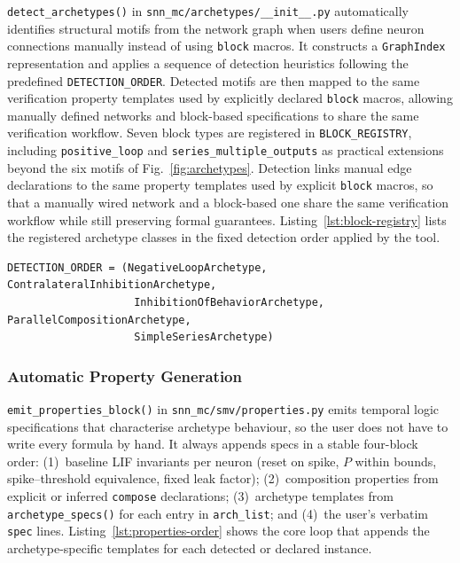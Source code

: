 \documentclass[
]{ceurart}
\begin{document}
\texttt{detect\_archetypes()} in \texttt{snn\_mc/archetypes/\_\_init\_\_.py}
automatically identifies structural motifs from the network graph when users
define neuron connections manually instead of using \texttt{block} macros. It
constructs a \texttt{GraphIndex} representation and applies a sequence of
detection heuristics following the predefined
\texttt{DETECTION\_ORDER}. Detected motifs are then mapped to the same
verification property templates used by explicitly declared
\texttt{block} macros, allowing manually defined networks and block-based
specifications to share the same verification workflow.
Seven block types are registered in \texttt{BLOCK\_REGISTRY}, including
\texttt{positive\_loop} and \texttt{series\_multiple\_outputs} as
practical extensions beyond the six motifs of Fig.~\ref{fig:archetypes}.
Detection links manual edge declarations to the same property templates
used by explicit \texttt{block} macros, so that a manually wired network
and a block-based one share the same verification workflow while still
preserving formal guarantees. Listing~\ref{lst:block-registry} lists the
registered archetype classes in the fixed detection order applied by the
tool.

\begin{lstlisting}[style=pythoncode,caption={Archetype registry and detection order.},label=lst:block-registry]
DETECTION_ORDER = (NegativeLoopArchetype, ContralateralInhibitionArchetype,
                    InhibitionOfBehaviorArchetype, ParallelCompositionArchetype,
                    SimpleSeriesArchetype)
\end{lstlisting}

\subsubsection{Automatic Property Generation}

\texttt{emit\_properties\_block()} in \texttt{snn\_mc/smv/properties.py}
emits temporal logic specifications that characterise archetype behaviour,
so the user does not have to write every formula by hand. It always
appends specs in a stable four-block order: (1)~baseline LIF invariants
per neuron (reset on spike, $P$ within bounds, spike--threshold
equivalence, fixed leak factor); (2)~composition properties from explicit
or inferred \texttt{compose} declarations; (3)~archetype templates from
\texttt{archetype\_specs()} for each entry in \texttt{arch\_list}; and
(4)~the user's verbatim \texttt{spec} lines. Listing~\ref{lst:properties-order}
shows the core loop that appends the archetype-specific templates for
each detected or declared instance.
\end{document}
